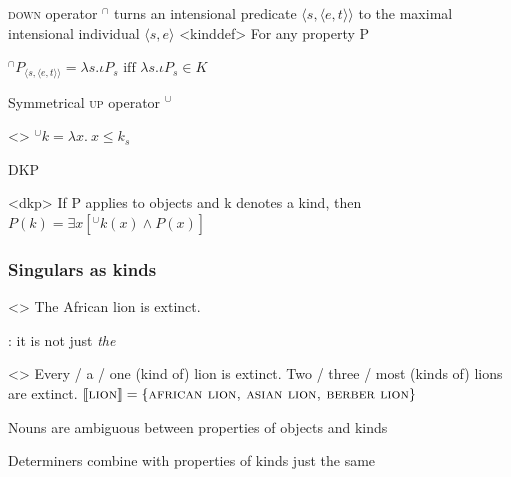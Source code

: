 \documentclass[9pt, t]{beamer}
\begin{document}
\begin{frame}
    \frametitle{\citep{chierchia1998}}

    \textsc{down} operator $^\cap$ turns an intensional predicate $\langle s, \langle e,t\rangle\rangle$ to the maximal intensional individual $\langle s, e\rangle$
    \ex<kinddef>
        For any property P

        $^\cap P_{\langle s,\langle e,t\rangle\rangle} = \lambda s.\iota P_s \text{ iff }\lambda s.\iota P_s\in K$
    \xe

    Symmetrical \textsc{up} operator $^\cup$

    \ex<>
        $^\cup k = \lambda x.\ x\le k_s$
    \xe

    DKP

    \ex<dkp>
        If P applies to objects and k denotes a kind, then\\
        $P(k) = \exists x[^\cup k(x) \land P(x)]$
    \xe
\end{frame}




    
    

\begin{frame}
    \frametitle{Singulars as kinds}

    
    \ex<>
    The African lion is extinct.
    \xe
    
    \citep{krifka1999,dayal2004}: it is not just \textit{the}
    
    
    \pex<>
        \a Every / a / one (kind of) lion is extinct.
        \a Two / three / most (kinds of) lions are extinct.
        \a $\llbracket \textsc{lion} \rrbracket = \{\textsc{african lion, asian lion, berber lion}\}$
    \xe
                
    Nouns are ambiguous between properties of objects and kinds

    Determiners combine with properties of kinds just the same

\end{frame}
\end{document}

